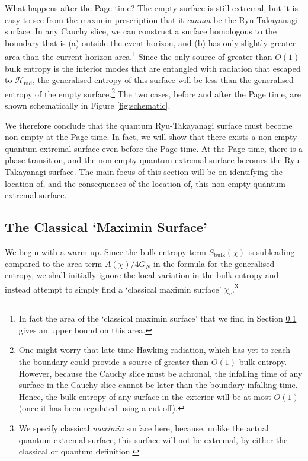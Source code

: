 \documentclass[12pt]{article}
\begin{document}
What happens after the Page time? The empty surface is still extremal, but it is easy to see from the maximin prescription that it \emph{cannot} be the Ryu-Takayanagi surface. In any Cauchy slice, we can construct a surface homologous to the boundary that is (a) outside the event horizon, and (b) has only slightly greater area than the current horizon area.\footnote{In fact the area of the `classical maximin surface' that we find in Section \ref{sec:classicalmaximin} gives an upper bound on this area.} Since the only source of greater-than-$O(1)$ bulk entropy is the interior modes that are entangled with radiation that escaped to $\mathcal{H}_\text{rad}$, the generalised entropy of this surface will be less than the generalised entropy of the empty surface.\footnote{One might worry that late-time Hawking radiation, which has yet to reach the boundary could provide a source of greater-than-$O(1)$ bulk entropy. However, because the Cauchy slice must be achronal, the infalling time of any surface in the Cauchy slice cannot be later than the boundary infalling time. Hence, the bulk entropy of any surface in the exterior will be at most $O(1)$ (once it has been regulated using a cut-off).} The two cases, before and after the Page time, are shown schematically in Figure \ref{fig:schematic}.

We therefore conclude that the quantum Ryu-Takayanagi surface must become non-empty at the Page time. In fact, we will show that there exists a non-empty quantum extremal surface even before the Page time. At the Page time, there is a phase transition, and the non-empty quantum extremal surface becomes the Ryu-Takayanagi surface. The main focus of this section will be on identifying the location of, and the consequences of the location of, this non-empty quantum extremal surface.


\subsection{The Classical `Maximin Surface'} \label{sec:classicalmaximin}

We begin with a warm-up. Since the bulk entropy term $S_\text{bulk}(\chi)$ is subleading compared to the area term $A(\chi)/4G_N$ in the formula for the generalised entropy, we shall initially ignore the local variation in the bulk entropy and instead attempt to simply find a `classical maximin surface' $\chi_c$.\footnote{We specify classical \emph{maximin} surface here, because, unlike the actual quantum extremal surface, this surface will not be extremal, by either the classical or quantum definition.} 
\end{document}

